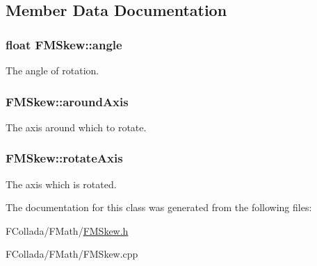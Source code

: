 \subsection{Member Data Documentation}
\hypertarget{classFMSkew_a3001b0a58b660f6b4677aa6e0381e25e}{
\subsubsection[{angle}]{\setlength{\rightskip}{0pt plus 5cm}float {\bf FMSkew::angle}}}
\label{classFMSkew_a3001b0a58b660f6b4677aa6e0381e25e}
The angle of rotation. \hypertarget{classFMSkew_aeb3dfd593df446ebdc89996b803ff5f0}{
\subsubsection[{aroundAxis}]{ {\bf FMSkew::aroundAxis}}}
\label{classFMSkew_aeb3dfd593df446ebdc89996b803ff5f0}
The axis around which to rotate. \hypertarget{classFMSkew_a7cf70bef4d980753e946c20ddbe24e80}{
\subsubsection[{rotateAxis}]{ {\bf FMSkew::rotateAxis}}}
\label{classFMSkew_a7cf70bef4d980753e946c20ddbe24e80}
The axis which is rotated. 

The documentation for this class was generated from the following files:\begin{DoxyCompactItemize}
\item 
FCollada/FMath/\hyperlink{FMSkew_8h}{FMSkew.h}\item 
FCollada/FMath/FMSkew.cpp\end{DoxyCompactItemize}
